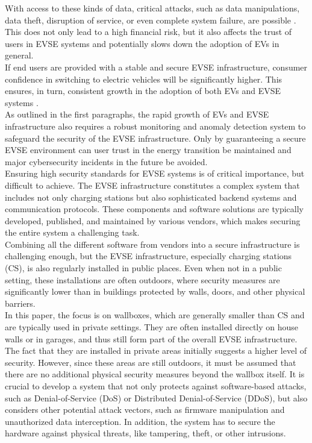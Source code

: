 With access to these kinds of data, critical attacks, such as data manipulations, data theft, disruption of service, or even complete system failure, are possible \cite{nature2025}. This does not only lead to a high financial risk, but it also affects the trust of users in EVSE systems and potentially slows down the adoption of EVs in general.\\
If end users are provided with a stable and secure EVSE infrastructure, consumer confidence in switching to electric vehicles will be significantly higher. This ensures, in turn, consistent growth in the adoption of both EVs and EVSE systems \cite{evse-cybersecurity2025}.\\
As outlined in the first paragraphs, the rapid growth of EVs and EVSE infrastructure also requires a robust monitoring and anomaly detection system to safeguard the security of the EVSE infrastructure. Only by guaranteeing a secure EVSE environment can user trust in the energy transition be maintained and major cybersecurity incidents in the future be avoided.\\

Ensuring high security standards for EVSE systems is of critical importance, but difficult to achieve. The EVSE infrastructure constitutes a complex system that includes not only charging stations but also sophisticated backend systems and communication protocols. These components and software solutions are typically developed, published, and maintained by various vendors, which makes securing the entire system a challenging task.\\
Combining all the different software from vendors into a secure infrastructure is challenging enough, but the EVSE infrastructure, especially charging stations (CS), is also regularly installed in public places. Even when not in a public setting, these installations are often outdoors, where security measures are significantly lower than in buildings protected by walls, doors, and other physical barriers.\\
In this paper, the focus is on wallboxes, which are generally smaller than CS and are typically used in private settings. They are often installed directly on house walls or in garages, and thus still form part of the overall EVSE infrastructure.\\
The fact that they are installed in private areas initially suggests a higher level of security. However, since these areas are still outdoors, it must be assumed that there are no additional physical security measures beyond the wallbox itself. It is crucial to develop a system that not only protects against software-based attacks, such as Denial-of-Service (DoS) or Distributed Denial-of-Service (DDoS), but also considers other potential attack vectors, such as firmware manipulation and unauthorized data interception. In addition, the system has to secure the hardware against physical threats, like tampering, theft, or other intrusions.\\

